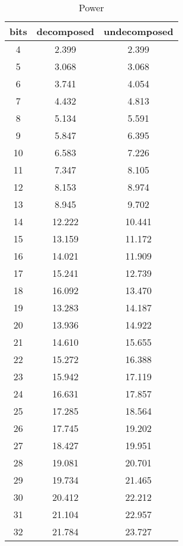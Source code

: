 \documentclass{article}
\begin{document}
\begin{table}[h]
\centering
\begin{tabular}{c | c | c }
bits	 & decomposed	 & undecomposed \\ 
\hline4	 & 2.399	 & 2.399 \\ 
5	 & 3.068	 & 3.068 \\ 
6	 & 3.741	 & 4.054 \\ 
7	 & 4.432	 & 4.813 \\ 
8	 & 5.134	 & 5.591 \\ 
9	 & 5.847	 & 6.395 \\ 
10	 & 6.583	 & 7.226 \\ 
11	 & 7.347	 & 8.105 \\ 
12	 & 8.153	 & 8.974 \\ 
13	 & 8.945	 & 9.702 \\ 
14	 & 12.222	 & 10.441 \\ 
15	 & 13.159	 & 11.172 \\ 
16	 & 14.021	 & 11.909 \\ 
17	 & 15.241	 & 12.739 \\ 
18	 & 16.092	 & 13.470 \\ 
19	 & 13.283	 & 14.187 \\ 
20	 & 13.936	 & 14.922 \\ 
21	 & 14.610	 & 15.655 \\ 
22	 & 15.272	 & 16.388 \\ 
23	 & 15.942	 & 17.119 \\ 
24	 & 16.631	 & 17.857 \\ 
25	 & 17.285	 & 18.564 \\ 
26	 & 17.745	 & 19.202 \\ 
27	 & 18.427	 & 19.951 \\ 
28	 & 19.081	 & 20.701 \\ 
29	 & 19.734	 & 21.465 \\ 
30	 & 20.412	 & 22.212 \\ 
31	 & 21.104	 & 22.957 \\ 
32	 & 21.784	 & 23.727 \\ 
\end{tabular}
\caption{Power}
\end{table}
\end{document}
